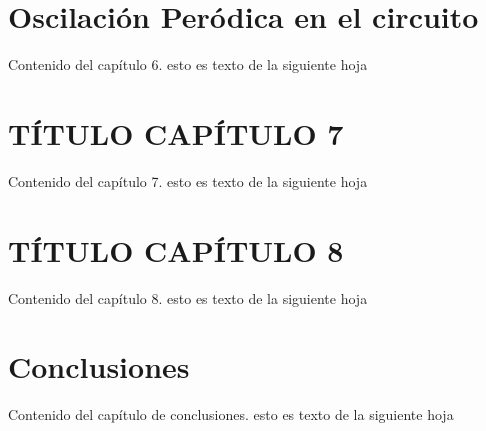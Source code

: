 \documentclass[12pt,a4paper]{report} %
\begin{document}
	\chapter{Oscilación Peródica en el circuito}
	Contenido del capítulo 6.
	\newpage
	esto es texto de la siguiente hoja
	
	\chapter{TÍTULO CAPÍTULO 7}
	Contenido del capítulo 7.
	\newpage
	esto es texto de la siguiente hoja
	
	\chapter{TÍTULO CAPÍTULO 8}
	Contenido del capítulo 8.
	\newpage
	esto es texto de la siguiente hoja
	
	\chapter*{Conclusiones}
	Contenido del capítulo de conclusiones.
	\newpage
	esto es texto de la siguiente hoja
	

\end{document}
